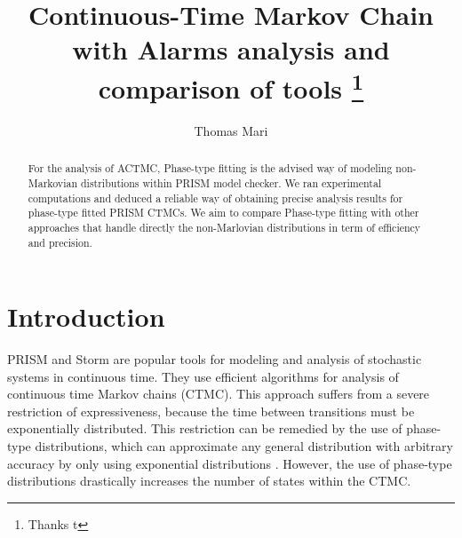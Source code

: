 \documentclass[runningheads,custombib]{llncs}
\begin{document}
%
\title{Continuous-Time Markov Chain with Alarms analysis and comparison of tools \thanks{Thanks t}}
%
%
\author{Thomas Mari}%
%
%
%
\maketitle              %
%
\begin{abstract}
For the analysis of ACTMC, Phase-type fitting is the advised way of modeling non-Markovian distributions within PRISM model checker. We ran experimental computations and deduced a reliable way of obtaining precise analysis results for phase-type fitted PRISM CTMCs.
We aim to compare Phase-type fitting with other approaches that handle directly the non-Marlovian distributions in term of efficiency and precision.


\end{abstract}
%
%
%
\section{Introduction}

	PRISM \cite{KNP11} and Storm \cite{DBLP:journals/corr/DehnertJK017} are popular tools for modeling and analysis of stochastic systems in continuous time. They use efficient algorithms for analysis of continuous time Markov chains (CTMC). This approach suffers from a severe restriction of expressiveness, because the time between transitions must be exponentially distributed. This restriction can be remedied by the use of phase-type distributions, which can approximate any general distribution with arbitrary accuracy by only using exponential distributions \cite{Buchholz:2014:IMP:2683922}. However, the use of phase-type distributions drastically increases the number of states within the CTMC.
	
\end{document}
